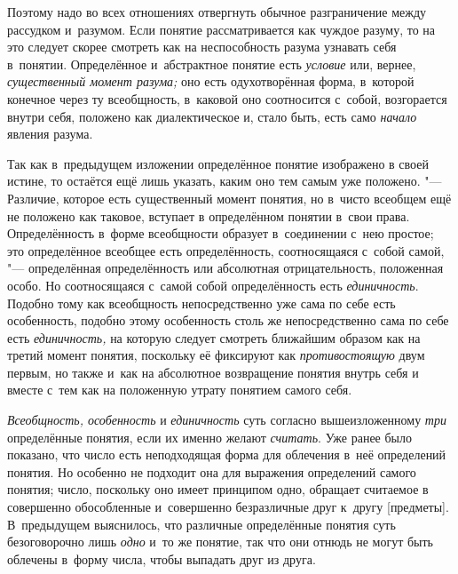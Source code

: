 Поэтому надо во всех отношениях отвергнуть обычное
разграничение между рассудком и~разумом. Если понятие рассматривается как
чуждое разуму, то на это следует скорее смотреть как на неспособность
разума узнавать себя в~понятии. Определённое и~абстрактное понятие есть
{\em условие} или, вернее, {\em существенный момент
разума;} оно есть одухотворённая форма, в~которой конечное
через ту всеобщность, в~каковой оно соотносится с~собой, возгорается внутри
себя, положено как диалектическое и, стало быть, есть само
{\em начало} явления разума.

Так как в~предыдущем изложении определённое понятие изображено
в своей истине, то остаётся ещё лишь указать, каким оно тем самым уже
положено. "--- Различие, которое есть существенный момент
понятия, но в~чисто всеобщем ещё не положено как таковое, вступает в
определённом понятии в~свои права. Определённость в~форме всеобщности
образует в~соединении с~нею простое; это определённое
всеобщее есть определённость, соотносящаяся с~собой самой, "---
определённая определённость или абсолютная отрицательность,
положенная особо. Но соотносящаяся с~самой собой определённость есть
{\em единичность}.
Подобно тому как всеобщность непосредственно уже сама по себе
есть особенность, подобно этому особенность столь же непосредственно сама
по себе есть {\em единичность,}
на которую следует смотреть ближайшим образом как на третий
момент понятия, поскольку её фиксируют как {\em противостоящую} двум
первым, но также и~как на абсолютное возвращение понятия внутрь себя и
вместе с~тем как на положенную утрату понятием самого себя.


{\em Всеобщность, особенность} и {\em единичность} суть согласно
вышеизложенному {\em три} определённые понятия, если их именно желают
{\em считать}. Уже ранее было показано, что число есть неподходящая форма для
облечения в~неё определений понятия. Но особенно не подходит она для выражения определений самого
понятия; число, поскольку оно имеет принципом одно, обращает считаемое в
совершенно обособленные и~совершенно безразличные друг к~другу [предметы].
В~предыдущем выяснилось, что различные определённые понятия суть безоговорочно
лишь {\em одно} и~то же понятие, так что они отнюдь не могут быть облечены
в~форму числа, чтобы выпадать друг из друга.

